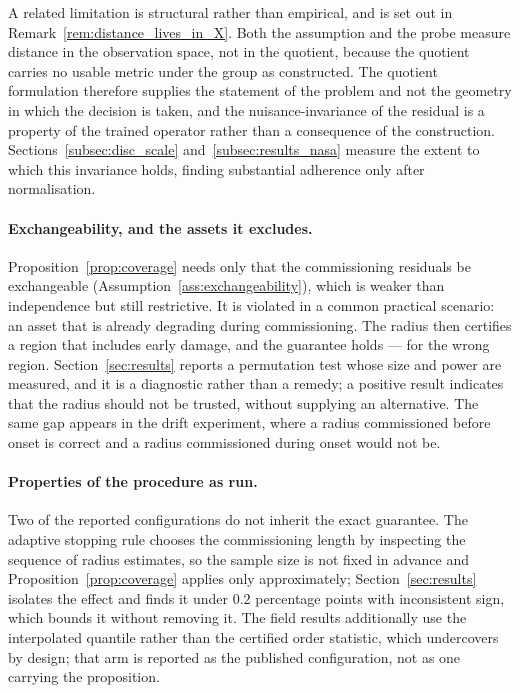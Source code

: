 \documentclass[a4paper]{cas-sc}
\begin{document}
A related limitation is structural rather than empirical, and is set out in
Remark~\ref{rem:distance_lives_in_X}. Both the assumption and the probe measure
distance in the observation space, not in the quotient, because the quotient
carries no usable metric under the group as constructed. The quotient
formulation therefore supplies the statement of the problem and not the
geometry in which the decision is taken, and the nuisance-invariance of the
residual is a property of the trained operator rather than a consequence of
the construction. Sections~\ref{subsec:disc_scale}
and~\ref{subsec:results_nasa} measure the extent to which this invariance holds,
finding substantial adherence only after normalisation.

\paragraph{Exchangeability, and the assets it excludes.}
Proposition~\ref{prop:coverage} needs only that the commissioning residuals be
exchangeable (Assumption~\ref{ass:exchangeability}), which is weaker than
independence but still restrictive. It is violated in a common practical scenario:
an asset that is already degrading during commissioning.
The radius then certifies a region that includes early damage,
and the guarantee holds --- for the wrong region. Section~\ref{sec:results}
reports a permutation test whose size and power are measured, and it is a
diagnostic rather than a remedy; a positive result indicates that the radius
should not be trusted, without supplying an alternative. The same gap appears in
the drift experiment, where a radius commissioned before onset is correct and a
radius commissioned during onset would not be.

\paragraph{Properties of the procedure as run.}
Two of the reported configurations do not inherit the exact guarantee. The
adaptive stopping rule chooses the commissioning length by inspecting the
sequence of radius estimates, so the sample size is not fixed in advance and
Proposition~\ref{prop:coverage} applies only approximately;
Section~\ref{sec:results} isolates the effect and finds it under \(0.2\)
percentage points with inconsistent sign, which bounds it without removing it.
The field results additionally use the interpolated quantile rather than the
certified order statistic, which undercovers by design; that arm is reported
as the published configuration, not as one carrying the proposition.
\end{document}
